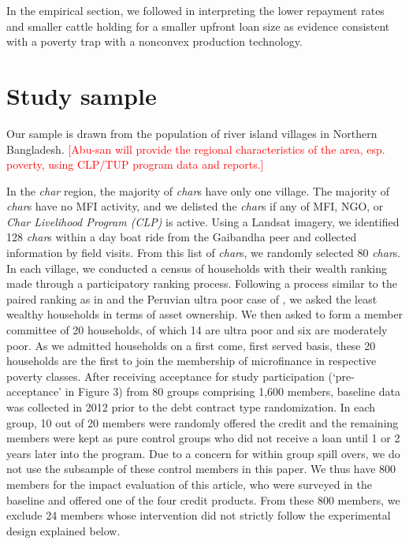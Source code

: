 	In the empirical section, we followed \citet{BandieraBRAC2017} in interpreting the lower repayment rates and smaller cattle holding for a smaller upfront loan size as evidence consistent with a poverty trap with a nonconvex production technology. 

\section{Study sample}
\label{SecStudySample}

	Our sample is drawn from the population of river island villages in Northern Bangladesh. 
	\textcolor{red}{[Abu-san will provide the regional characteristics of the area, esp. poverty, using CLP/TUP program data and reports.]}
	
	In the \textit{char} region, the majority of \textit{char}s have only one village. The majority of \textit{char}s have no MFI activity, and we delisted the \textit{char}s if any of MFI, NGO, or \textit{Char Livelihood Program (CLP)} is active. Using a Landsat imagery, we identified 128 \textit{char}s within a day boat ride from the Gaibandha peer and collected information by field visits. From this list of \textit{char}s, we randomly selected 80 \textit{char}s. In each village, we conducted a census of households with their wealth ranking made through a participatory ranking process. Following a process similar to the paired ranking as in \citet[][p.1212]{Alatas2012} and the Peruvian ultra poor case of \citet[][p.66]{KarlanThuysbaert2019}, we asked the least wealthy households in terms of asset ownership. We then asked to form a member committee of 20 households, of which 14 are ultra poor and six are moderately poor. As we admitted households on a first come, first served basis, these 20 households are the first to join the membership of microfinance in respective poverty classes. After receiving acceptance for study participation (‘pre-acceptance’ in Figure 3) from 80 groups comprising 1,600 members, baseline data was collected in 2012 prior to the debt contract type randomization. In each group, 10 out of 20 members were randomly offered the credit and the remaining members were kept as pure control groups who did not receive a loan until 1 or 2 years later into the program. Due to a concern for within group spill overs, we do not use the subsample of these control members in this paper. We thus have 800 members for the impact evaluation of this article, who were surveyed in the baseline and offered one of the four credit products. From these 800 members, we exclude 24 members whose intervention did not strictly follow the experimental design explained below.
	

